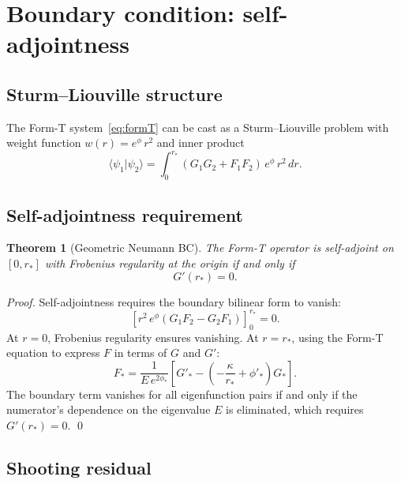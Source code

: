\documentclass[11pt,letterpaper]{article}
\newtheorem{theorem}{Theorem}[section]
\numberwithin{equation}{section}
\begin{document}
\section{Boundary condition: self-adjointness}
\label{sec:selfadjoint}

\subsection{Sturm--Liouville structure}

The Form-T system~\eqref{eq:formT} can be cast as a Sturm--Liouville
problem with weight function $w(r) = e^{\phi}\,r^2$ and inner product
\begin{equation}
\label{eq:inner_product}
  \langle\psi_1|\psi_2\rangle = \int_0^{r_*}\!\left(G_1 G_2 + F_1 F_2\right)\,e^{\phi}\,r^2\,dr.
\end{equation}

\subsection{Self-adjointness requirement}

\begin{theorem}[Geometric Neumann BC]
\label{thm:neumann}
The Form-T operator is self-adjoint on $[0, r_*]$ with Frobenius regularity
at the origin if and only if
\begin{equation}
\label{eq:neumann_bc}
\boxed{G'(r_*) = 0.}
\end{equation}
\end{theorem}

\textit{Proof.}
Self-adjointness requires the boundary bilinear form to vanish:
\begin{equation}
  \left[r^2\,e^{\phi}\!\left(G_1 F_2 - G_2 F_1\right)\right]_0^{r_*} = 0.
\end{equation}
At $r = 0$, Frobenius regularity ensures vanishing. At $r = r_*$, using the
Form-T equation to express $F$ in terms of $G$ and $G'$:
\begin{equation}
  F_* = \frac{1}{E\,e^{2\phi_*}}\!\left[G'_* - \left(-\frac{\kappa}{r_*} + \phi'_*\right)G_*\right].
\end{equation}
The boundary term vanishes for all eigenfunction pairs if and only if
the numerator's dependence on the eigenvalue $E$ is eliminated, which
requires $G'(r_*) = 0$. \qed

\subsection{Shooting residual}
\end{document}
